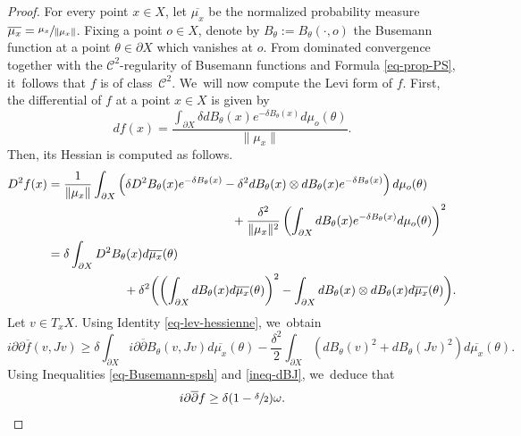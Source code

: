 \begin{proof}
For every point $x\in X$, let $\overline{\mu_x}$ be the normalized probability measure \hbox{$\overline{\mu_x} = \sfrac{\mu_x}{\lVert \mu_x\rVert}$}. Fixing a point $o\in X$, denote by $B_\theta:=B_{\theta}(\cdot,o)$ the Busemann function at a point $\theta\in \partial X$ which vanishes at $o$. From dominated convergence together with the $\mathcal{C}^2$\nobreakdash-regularity of Busemann functions and Formula \eqref{eq-prop-PS}, it~follows that $f$ is of class~$\mathcal{C}^2$. We~will now compute the Levi form of $f$. First, the differential of $f$ at a point $x\in X$ is given by
\begin{equation*}
df(x) = \frac{\int_{\partial X}\delta dB_{\theta}(x)e^{-\delta B_{\theta}(x)}d\mu_o(\theta)}{\lVert \mu_x\rVert}.
\end{equation*}
Then, its Hessian is computed as follows.
\begin{align*}
\begin{split}
D^{2}f(x) &= \frac{1}{\lVert \mu_x\rVert}\int_{\partial X}\left(\delta D^{2}B_{\theta}(x)e^{-\delta B_{\theta}(x)}-\delta^{2}dB_{\theta}(x)\otimes dB_{\theta}(x)e^{-\delta B_{\theta}(x)}\right)d\mu_o(\theta) \\ & \hspace{5.3cm}+ \frac{\delta^{2}}{\lVert \mu_x\rVert^{2}}\left(\int_{\partial X}dB_{\theta}(x)e^{-\delta B_{\theta}(x)}d\mu_o(\theta)\right)^{2}\\
&={\delta}\int_{\partial X}D^{2}B_{\theta}(x)d\overline{\mu_x}(\theta) \\& \hspace{2.2cm}+ {\delta^{2}}\biggl(\left(\int_{\partial X}dB_{\theta}(x)d\overline{\mu_x}(\theta)\right)^{2}-\int_{\partial X}dB_{\theta}(x)\otimes dB_{\theta}(x)d\overline{\mu_x}(\theta)\biggr).
\end{split}
\end{align*}
Let $v\in T_xX$. Using Identity \eqref{eq-lev-hessienne}, we~obtain
\begin{equation*}
i\partial{\partial}\overline{f}(v,Jv) \ge \delta \int_{\partial X}i\partial\overline{\partial}B_{\theta}(v,Jv)d\overline{\mu_x}(\theta) - \frac{\delta^{2}}{2}\int_{\partial X}(dB_{\theta}(v)^{2}+dB_{\theta}(Jv)^{2}) d\overline{\mu_x}(\theta).
\end{equation*}
Using Inequalities \eqref{eq-Busemann-spsh} and \eqref{ineq-dBJ}, we~deduce that
\begin{equation*}
i\partial\overline{\partial}{f} \ge \delta(1-\sfrac{\delta}{2})\omega.\qedhere
\end{equation*}
\end{proof}

